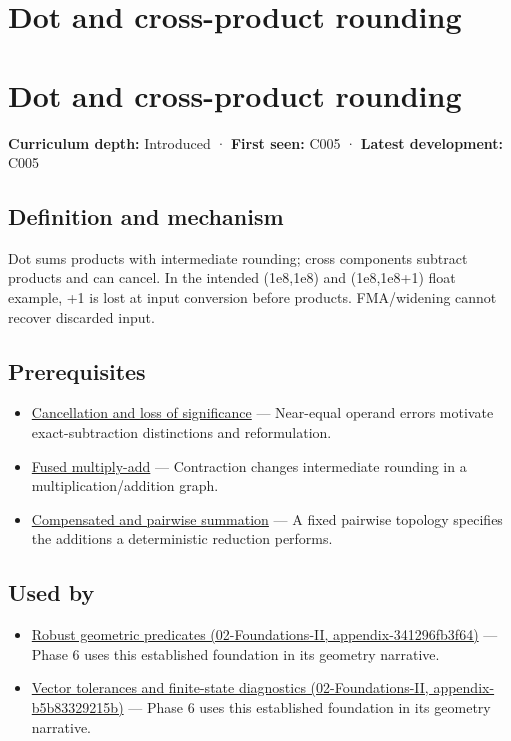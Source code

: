 \hypertarget{appendix-5aef4f13483a}{}
\section*{Dot and cross-product rounding}
\section{Dot and cross-product rounding}\label{appendix-5aef4f13483a-dot-and-cross-product-rounding}

\textbf{Curriculum depth:} Introduced · \textbf{First seen:} C005 · \textbf{Latest development:} C005

\subsection{Definition and mechanism}\label{appendix-5aef4f13483a-definition-and-mechanism}

Dot sums products with intermediate rounding; cross components subtract products and can cancel. In the intended (1e8,1e8) and (1e8,1e8+1) float example, +1 is lost at input conversion before products. FMA/widening cannot recover discarded input.

\subsection{Prerequisites}\label{appendix-5aef4f13483a-prerequisites}

\begin{itemize}
\tightlist
\item
  \hyperref[appendix-a2773a6a2f9d]{Cancellation and loss of significance} --- Near-equal operand errors motivate exact-subtraction distinctions and reformulation.
\item
  \hyperref[appendix-41e8ef22a21e]{Fused multiply-add} --- Contraction changes intermediate rounding in a multiplication/addition graph.
\item
  \hyperref[appendix-df318da57389]{Compensated and pairwise summation} --- A fixed pairwise topology specifies the additions a deterministic reduction performs.
\end{itemize}

\subsection{Used by}\label{appendix-5aef4f13483a-used-by}

\begin{itemize}
\tightlist
\item
  \href{../02-Foundations-II/main.pdf\#nameddest=appendix-341296fb3f64}{Robust geometric predicates (02-Foundations-II, appendix-341296fb3f64)} --- Phase 6 uses this established foundation in its geometry narrative.
\item
  \href{../02-Foundations-II/main.pdf\#nameddest=appendix-b5b83329215b}{Vector tolerances and finite-state diagnostics (02-Foundations-II, appendix-b5b83329215b)} --- Phase 6 uses this established foundation in its geometry narrative.
\end{itemize}


